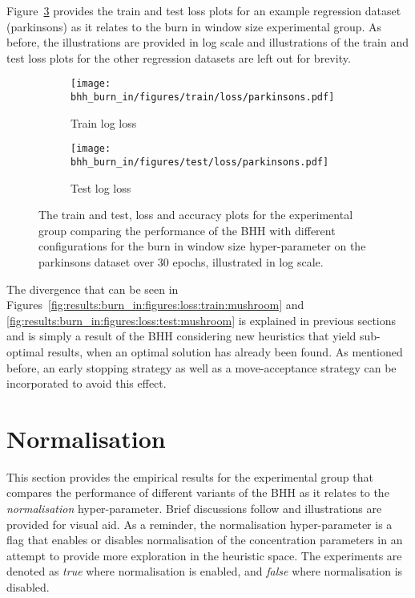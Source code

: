 Figure~\ref{fig:results:burn_in:figures:parkinsons} provides the train and test loss plots for an example regression dataset (parkinsons) as it relates to the burn in window size experimental group. As before, the illustrations are provided in log scale and illustrations of the train and test loss plots for the other regression datasets are left out for brevity.

\begin{figure}[htbp]
      \begin{subfigure}{0.5\textwidth}
            \centering
            \texttt{[image: bhh\_burn\_in/figures/train/loss/parkinsons.pdf]}
            \caption{Train log loss}
            \label{fig:results:burn_in:figures:loss:train:parkinsons}
      \end{subfigure}
      \begin{subfigure}{0.5\textwidth}
            \centering
            \texttt{[image: bhh\_burn\_in/figures/test/loss/parkinsons.pdf]}
            \caption{Test log loss}
            \label{fig:results:burn_in:figures:loss:test:parkinsons}
      \end{subfigure}
      \par\bigskip
      \caption{The train and test, loss and accuracy plots for the experimental group comparing the performance of the \acs{BHH} with different configurations for the burn in window size hyper-parameter on the parkinsons dataset over 30 epochs, illustrated in log scale.}
      \label{fig:results:burn_in:figures:parkinsons}
\end{figure}

The divergence that can be seen in Figures~\ref{fig:results:burn_in:figures:loss:train:mushroom} and \ref{fig:results:burn_in:figures:loss:test:mushroom} is explained in previous sections and is simply a result of the \acs{BHH} considering new heuristics that yield sub-optimal results, when an optimal solution has already been found. As mentioned before, an early stopping strategy as well as a move-acceptance strategy can be incorporated to avoid this effect.


\section{Normalisation}\label{sec:results:normalise}

This section provides the empirical results for the experimental group that compares the performance of different variants of the \acs{BHH} as it relates to the \textit{normalisation} hyper-parameter. Brief discussions follow and illustrations are provided for visual aid. As a reminder, the normalisation hyper-parameter is a flag that enables or disables normalisation of the concentration parameters in an attempt to provide more exploration in the heuristic space. The experiments are denoted as \textit{true} where normalisation is enabled, and \textit{false} where normalisation is disabled.

